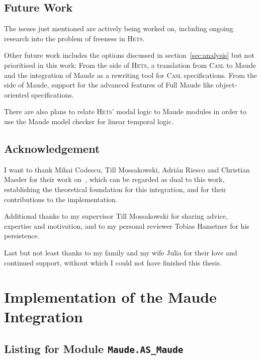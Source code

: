 \documentclass[11pt]{article}
\newcommand{\Casl}{\textsc{Casl}}
\newcommand{\Hets}{\textsc{Hets}}
\begin{document}
\subsection{Future Work}
\label{sub:conclusion_future}

The issues just mentioned are actively being worked on, including ongoing research into the problem of freeness in \Hets{}.

Other future work includes the options discussed in section~\ref{sec:analysis} but not prioritised in this work: From the side of \Hets{}, a translation from \Casl{} to Maude and the integration of Maude as a rewriting tool for \Casl{} specifications. From the side of Maude, support for the advanced features of Full Maude like object-oriented specifications.

There are also plans to relate \Hets{}' modal logic to Maude modules in order to use the Maude model checker for linear temporal logic.


\subsection{Acknowledgement}
\label{sub:conclusion_ack}

I want to thank Mihai Codescu, Till Mossakowski, Adri\'an Riesco and Christian Maeder for their work on~\cite{Codescu:2010}, which can be regarded as dual to this work, establishing the theoretical foundation for this integration, and for their contributions to the implementation.

Additional thanks to my supervisor Till Mossakowski for sharing advice, expertise and motivation, and to my personal reviewer Tobias Hametner for his persistence.

Last but not least thanks to my family and my wife Julia for their love and continued support, without which I could not have finished this thesis.


\appendix

\clearpage
\section{Implementation of the Maude Integration} %
\label{sec:appendix_implementation}

\subsection{Listing for Module \texttt{Maude.AS\_Maude}}
\label{imp:Maude/AS_Maude.hs}

\clearpage
\end{document}
